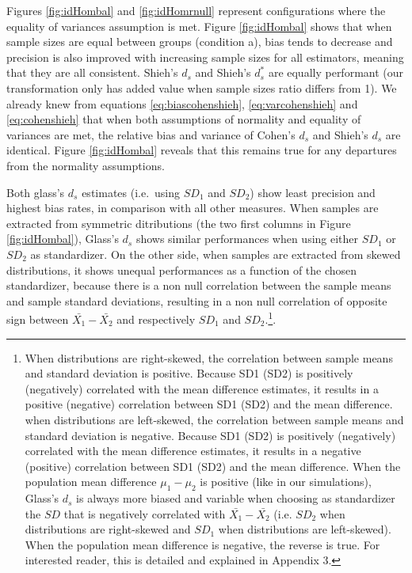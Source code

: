 \documentclass[
  man,floatsintext]{apa6}
\begin{document}
Figures \ref{fig:idHombal} and \ref{fig:idHomrnull} represent configurations where the equality of variances assumption is met. Figure \ref{fig:idHombal} shows that when sample sizes are equal between groups (condition a), bias tends to decrease and precision is also improved with increasing sample sizes for all estimators, meaning that they are all consistent. Shieh's \(d_s\) and Shieh's \(d^*_s\) are equally performant (our transformation only has added value when sample sizes ratio differs from 1). We already knew from equations \ref{eq:biascohenshieh}, \ref{eq:varcohenshieh} and \ref{eq:cohenshieh} that when both assumptions of normality and equality of variances are met, the relative bias and variance of Cohen's \(d_s\) and Shieh's \(d_s\) are identical. Figure \ref{fig:idHombal} reveals that this remains true for any departures from the normality assumptions.

Both glass's \(d_s\) estimates (i.e.~using \(SD_1\) and \(SD_2\)) show least precision and highest bias rates, in comparison with all other measures. When samples are extracted from symmetric ditributions (the two first columns in Figure \ref{fig:idHombal}), Glass's \(d_s\) shows similar performances when using either \(SD_1\) or \(SD_2\) as standardizer. On the other side, when samples are extracted from skewed distributions, it shows unequal performances as a function of the chosen standardizer, because there is a non null correlation between the sample means and sample standard deviations, resulting in a non null correlation of opposite sign between \(\bar{X_1}-\bar{X_2}\) and respectively \(SD_1\) and \(SD_2\).\footnote{When distributions are right-skewed, the correlation between sample means and standard deviation is positive. Because SD1 (SD2) is positively (negatively) correlated with the mean difference estimates, it results in a positive (negative) correlation between SD1 (SD2) and the mean difference. when distributions are left-skewed, the correlation between sample means and standard deviation is negative. Because SD1 (SD2) is positively (negatively) correlated with the mean difference estimates, it results in a negative (positive) correlation between SD1 (SD2) and the mean difference.  When the population mean difference $\mu_1-\mu_2$ is positive (like in our simulations), Glass's $d_s$ is always more biased and variable when choosing as standardizer the $SD$ that is negatively correlated with $\bar{X_1}-\bar{X_2}$ (i.e. $SD_2$ when distributions are right-skewed and $SD_1$ when distributions are left-skewed). When the population mean difference is negative, the reverse is true. For interested reader, this is detailed and explained in Appendix 3.}.
\end{document}
